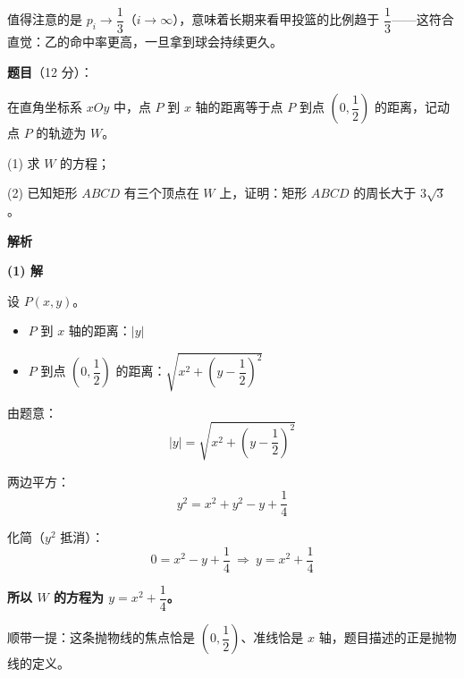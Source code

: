 \begin{answer}
\begin{gktip}
值得注意的是 $p_i\to\dfrac13$（$i\to\infty$），意味着长期来看甲投篮的比例趋于 $\dfrac13$——这符合直觉：乙的命中率更高，一旦拿到球会持续更久。
\end{gktip}




\par\medskip

\end{answer}
\begin{answer}

\textbf{题目}（12 分）：

在直角坐标系 $xOy$ 中，点 $P$ 到 $x$ 轴的距离等于点 $P$ 到点 $\left(0,\dfrac12\right)$ 的距离，记动点 $P$ 的轨迹为 $W$。

  (1) 求 $W$ 的方程；

  (2) 已知矩形 $ABCD$ 有三个顶点在 $W$ 上，证明：矩形 $ABCD$ 的周长大于 $3\sqrt3$。

\par\medskip

\textbf{解析}

\par\medskip

\textbf{(1) 解}

设 $P(x,y)$。

\begin{itemize}
\item $P$ 到 $x$ 轴的距离：$|y|$
\item $P$ 到点 $\left(0,\dfrac12\right)$ 的距离：$\sqrt{x^{2}+\left(y-\dfrac12\right)^{2}}$
\end{itemize}

由题意：
\nopagebreak[4]
\[|y|=\sqrt{x^{2}+\left(y-\frac12\right)^{2}}\]

两边平方：
\nopagebreak[4]
\[y^{2}=x^{2}+y^{2}-y+\frac14\]

化简（$y^{2}$ 抵消）：
\nopagebreak[4]
\[0=x^{2}-y+\frac14\ \Longrightarrow\ y=x^{2}+\frac14\]

\textbf{所以 $W$ 的方程为 $y=x^{2}+\dfrac14$。}

\begin{gktip}
顺带一提：这条抛物线的焦点恰是 $\left(0,\dfrac12\right)$、准线恰是 $x$ 轴，题目描述的正是抛物线的定义。
\end{gktip}


\end{answer}

